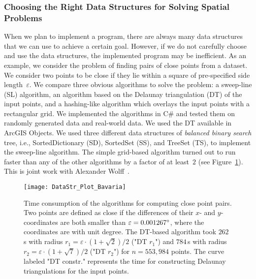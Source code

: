 \subsubsection{Choosing the Right Data Structures 
	for Solving Spatial Problems}

When we plan to implement a program, 
there are always many data structures that
we can use to achieve a certain goal.
However, if we do not carefully choose and use 
the data structures,
the implemented program may be inefficient.
As an example, we consider the problem of 
finding pairs of close points from a dataset. 
We consider two points to be close 
if they lie within a square of pre-specified 
side length~$\varepsilon$. 
We compare three obvious algorithms to solve the problem: 
a sweep-line (SL) algorithm, 
an algorithm based on the Delaunay triangulation (DT) 
of the input points, 
and a hashing-like algorithm 
which overlays the input points with a rectangular grid. 
We implemented the algorithms in C\# and tested them on 
randomly generated data and real-world data. 
We used the DT available in ArcGIS Objects. 
We used three different data structures
of \emph{balanced binary search} tree, 
i.e., SortedDictionary (SD), SortedSet (SS), and TreeSet (TS), 
to implement the sweep-line algorithm. 
The simple grid-based algorithm turned out to run faster than 
any of the other algorithms by a factor of at least~$2$ 
(see Figure~\ref{fig:Intro_DataStructure}).
This is joint work with 
Alexander Wolff~\parencite[see][]{Peng2014DataStr}.


\begin{figure}[tb]
\centering
\texttt{[image: DataStr\_Plot\_Bavaria]}
\caption{Time consumption of the algorithms
	for computing close point pairs. 
	Two points are defined as close if the differences 
	of their $x$- and $y$- coordinates are both smaller than
	$\varepsilon=0.001267 \degree$,
	where the coordinates are with unit degree. 
	The DT-based algorithm took $262\,$s 
	with radius $r_1=\varepsilon \cdot (1+\sqrt{2})/2$ 
	("DT $r_1$") and $784\,$s 
	with radius $r_2=\varepsilon \cdot (1+\sqrt{7})/2$ 
	("DT $r_2$") for $n=553{,}984$ points.
	The curve labeled "DT constr." represents 
	the time for constructing 
	Delaunay triangulations for the input points.
}
\label{fig:Intro_DataStructure}
\end{figure}



